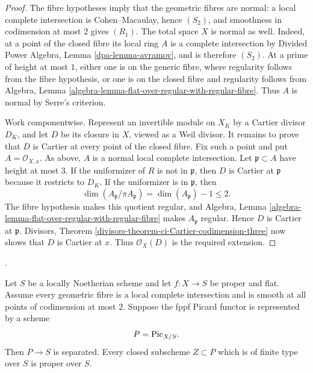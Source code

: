 \begin{proof}
The fibre hypotheses imply that the geometric fibres are normal: a local
complete intersection is Cohen--Macaulay, hence $(S_2)$, and smoothness in
codimension at most $2$ gives $(R_1)$. The total space $X$ is normal as well.
Indeed, at a point of the closed fibre its local ring $A$ is a complete
intersection by Divided Power Algebra, Lemma \ref{dpa-lemma-avramov}, and is
therefore $(S_2)$. At a prime of height at most $1$, either one is on the
generic fibre, where regularity follows from the fibre hypothesis, or one is
on the closed fibre and regularity follows from Algebra, Lemma
\ref{algebra-lemma-flat-over-regular-with-regular-fibre}. Thus $A$ is normal
by Serre's criterion.

Work componentwise. Represent an invertible module on $X_K$ by a Cartier
divisor $D_K$, and let $D$ be its closure in $X$, viewed as a Weil divisor.
It remains to prove that $D$ is Cartier at every point of the closed fibre.
Fix such a point and put $A=\mathcal{O}_{X,x}$. As above, $A$ is a normal
local complete intersection. Let $\mathfrak p\subset A$ have height at most
$3$. If the uniformizer of $R$ is not in $\mathfrak p$, then $D$ is Cartier
at $\mathfrak p$ because it restricts to $D_K$. If the uniformizer is in
$\mathfrak p$, then
$$
\dim(A_\mathfrak p/\pi A_\mathfrak p)
=\dim(A_\mathfrak p)-1\leq 2.
$$
The fibre hypothesis makes this quotient regular, and Algebra, Lemma
\ref{algebra-lemma-flat-over-regular-with-regular-fibre} makes
$A_\mathfrak p$ regular. Hence $D$ is Cartier at $\mathfrak p$. Divisors,
Theorem \ref{divisors-theorem-ci-Cartier-codimension-three} now shows that
$D$ is Cartier at $x$. Thus $\mathcal{O}_X(D)$ is the required extension.
\end{proof}

\begin{theorem}
\label{theorem-picard-flat-lci-codimension-two}
\begin{reference}
\cite[Expos\'e 236, Remark 2.2, pp. 231--232]{FGA}.
\end{reference}
Let $S$ be a locally Noetherian scheme and let $f:X\to S$ be proper and flat.
Assume every geometric fibre is a local complete intersection and is smooth
at all points of codimension at most $2$. Suppose the fppf Picard functor is
represented by a scheme
$$
P=\mathrm{Pic}_{X/S}.
$$
Then $P\to S$ is separated. Every closed subscheme $Z\subset P$ which is of
finite type over $S$ is proper over $S$.
\end{theorem}

